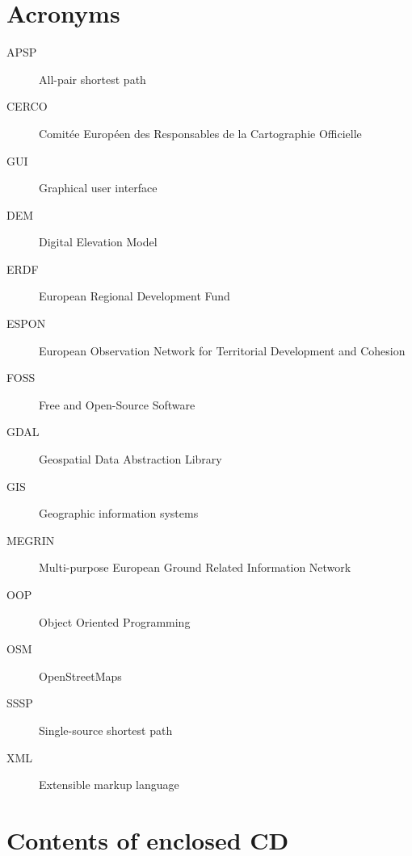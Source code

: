 \documentclass[thesis=M,english]{FITthesis}[2012/10/20]
\begin{document}
\chapter{Acronyms}
\begin{description}
	\item[APSP] All-pair shortest path
	\item[CERCO] Comit{\' e}e Europ{\' e}en des Responsables de la Cartographie Officielle\item[GUI] Graphical user interface
	\item[DEM] Digital Elevation Model
	\item[ERDF] European Regional Development Fund
	\item[ESPON] European Observation Network for Territorial Development and Cohesion
	\item[FOSS] Free and Open-Source Software
	\item[GDAL] Geospatial Data Abstraction Library
	\item[GIS] Geographic information systems	
	\item[MEGRIN] Multi-purpose European Ground Related Information Network
	\item[OOP] Object Oriented Programming
	\item[OSM] OpenStreetMaps
	\item[SSSP] Single-source shortest path
	\item[XML] Extensible markup language
	
	
\end{description}


\chapter{Contents of enclosed CD}


\begin{figure}
\end{figure}
\end{document}
